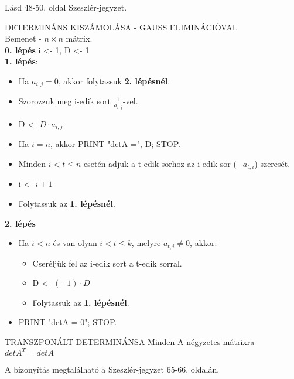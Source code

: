 \begin{bizonyitas}{}
Lásd 48-50. oldal Szeszlér-jegyzet.
\end{bizonyitas}

\begin{tetel}{DETERMINÁNS KISZÁMOLÁSA -  GAUSS ELIMINÁCIÓVAL\\
Bemenet - $n\times n$ mátrix}.\\
\textbf{0. lépés}
i <- 1, D <- 1\\
\textbf{1. lépés}:
\begin{itemize}
\item Ha $a_{i,j} = 0$, akkor folytassuk \textbf{2. lépésnél}.
\item Szorozzuk meg i-edik sort $\frac{1}{a_{i,j}}$-vel.
\item D <- $D \cdot a_{i,j}$
\item Ha $i = n$, akkor PRINT "detA =", D; STOP.
\item Minden $i < t \leq n$ esetén adjuk a t-edik sorhoz az i-edik sor ($-a_{t,i}$)-szeresét.
\item i <- $i+1$
\item Folytassuk az \textbf{1. lépésnél}.
\end{itemize}
\textbf{2. lépés}
\begin{itemize}
\item Ha $i < n$ és van olyan $i < t \leq k$, melyre $a_{t,i} \neq 0$, akkor:
\begin{itemize}
\item Cseréljük fel az i-edik sort a t-edik sorral.
\item D <- $(-1)\cdot D$
\item Folytassuk az \textbf{1. lépésnél}.
\end{itemize}
\item PRINT "detA = 0"; STOP.
\end{itemize}
\end{tetel}

\begin{tetel}{TRANSZPONÁLT DETERMINÁNSA}
Minden A négyzetes mátrixra $detA^T = detA$
\end{tetel}

\begin{bizonyitas}{}
A bizonyítás megtalálható a Szeszlér-jegyzet 65-66. oldalán.
\end{bizonyitas}

